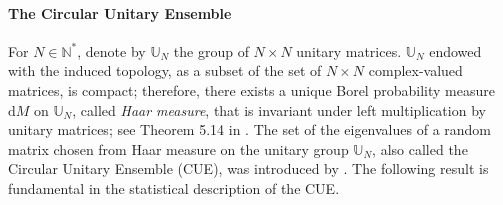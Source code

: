 \documentclass[twoside,11pt]{book}
\newtheorem{definition}{Definition}
\numberwithin{theorem}{chapter}
\numberwithin{definition}{chapter}
\numberwithin{proposition}{chapter}
\numberwithin{corollary}{chapter}
\numberwithin{example}{chapter}
\numberwithin{lemma}{chapter}
\numberwithin{assumption}{chapter}
\DeclareMathOperator{\Det}{Det}
\DeclareMathOperator{\Prb}{\mathbb{P}}
\begin{document}




\paragraph{The Circular Unitary Ensemble}


For $N \in \mathbb{N}^{*}$, denote by $\mathbb{U}_{N}$ the group of $N \times N$ unitary matrices. $\mathbb{U}_{N}$ endowed with the induced topology, as a subset of the set of $N\times N$ complex-valued matrices, is compact; therefore, there exists a unique Borel probability measure $\mathrm{d}M$ on $\mathbb{U}_{N}$, called \emph{Haar measure}, that is invariant under left multiplication by unitary matrices; see Theorem 5.14 in \citep{Rud91}. The set of the eigenvalues of a random matrix chosen from Haar measure on the unitary group $\mathbb{U}_{N}$, also called the Circular Unitary Ensemble (CUE), was introduced by \cite{Dys62}. The following result is fundamental in the statistical description of the CUE.

\end{document}
